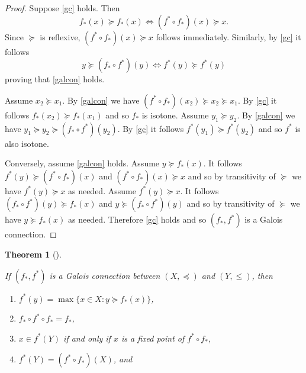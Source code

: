 \documentclass[
  letterpaper,
  10pt,
  reqno,
  twopage,
  openany]{book}
\providecommand{\tightlist}{%
  \setlength{\itemsep}{0pt}\setlength{\parskip}{0pt}}\usepackage{longtable,booktabs,array}
\theoremstyle{plain}
\theoremstyle{definition}
\theoremstyle{definition}
\theoremstyle{definition}
\theoremstyle{plain}
\theoremstyle{plain}
\newtheorem{theorem}{Theorem}[chapter]
\theoremstyle{remark}
\begin{document}
\begin{proof}

Suppose \eqref{gc} holds. Then \[
f_*(x) \succeq f_*(x)  \Longleftrightarrow (f^*\circ f_*)(x) \succeq x. 
\] Since \(\succeq\) is reflexive, \((f^*\circ f_*)(x)\succeq x\)
follows immediately. Similarly, by \eqref{gc} it follows \[
y \succeq (f_*\circ f^*)(y)  \Longleftrightarrow f^*(y)\succeq f^*(y)
\] proving that \eqref{galcon} holds.

Assume \(x_2\succeq x_1\). By \eqref{galcon} we have
\((f^*\circ f_*)(x_2)\succeq x_2\succeq x_1\). By \eqref{gc} it follows
\(f_*(x_2)\succeq f_*(x_1)\) and so \(f_*\) is isotone. Assume
\(y_1\succeq y_2\). By \eqref{galcon} we have
\(y_1\succeq y_2 \succeq (f_*\circ f^*)(y_2)\). By \eqref{gc} it follows
\(f^*(y_1)\succeq f^*(y_2)\) and so \(f^*\) is also isotone.

Conversely, assume \eqref{galcon} holds. Assume \(y\succeq f_*(x)\). It
follows \(f^*(y)\succeq (f^*\circ f_*)(x)\) and
\((f^*\circ f_*)(x)\succeq x\) and so by transitivity of \(\succeq\) we
have \(f^*(y)\succeq x\) as needed. Assume \(f^*(y)\succeq x\). It
follows \((f_*\circ f^*)(y)\succeq f_*(x)\) and
\(y\succeq (f_*\circ f^*)(y)\) and so by transitivity of \(\succeq\) we
have \(y\succeq f_*(x)\) as needed. Therefore \eqref{gc} holds and so
\((f_*, f^*)\) is a Galois connection.

\end{proof}

\leavevmode{}%
\begin{theorem}[]\label{thm-gcprop}

If \((f_*, f^*)\) is a Galois connection between \((X,\preceq)\) and
\((Y,\leqslant)\), then

\begin{enumerate}
\def\labelenumi{\arabic{enumi}.}
\tightlist
\item
  \(f^*(y)=\max\{x\in X : y\succeq f_*(x)\}\),
\item
  \(f_*\circ f^* \circ f_*=f_*\),
\item
  \(x\in f^*(Y)\) if and only if \(x\) is a fixed point of
  \(f^*\circ f_*\),
\item
  \(f^*(Y)=(f^*\circ f_*)(X)\), and
\end{enumerate}

\end{theorem}
\end{document}
